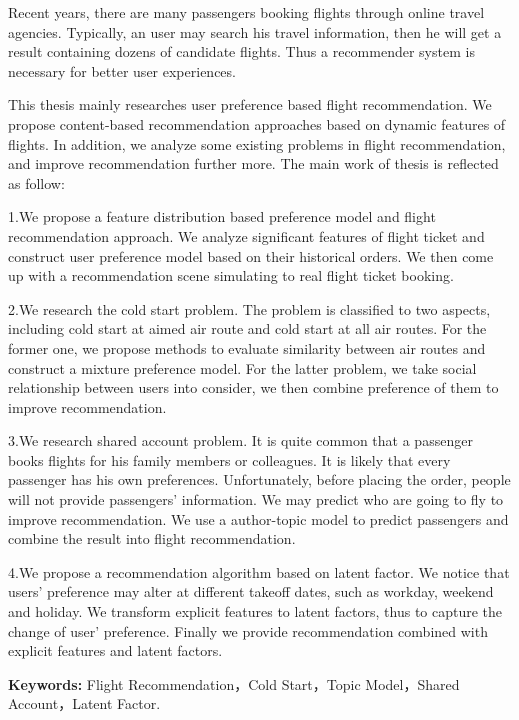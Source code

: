 \begin{englishabstract}

Recent years, there are many passengers booking flights through online travel agencies. Typically, an user may search his travel information, then he will get a result containing dozens of candidate flights. Thus a recommender system is necessary for better user experiences.

This thesis mainly researches user preference based flight recommendation. We propose content-based recommendation approaches based on dynamic features of flights. In addition, we analyze some existing problems in flight recommendation, and improve recommendation further more. The main work of thesis is reflected as follow:

1.We propose a feature distribution based preference model and flight recommendation approach. We analyze significant features of flight ticket and construct user preference model based on their historical orders. We then come up with a recommendation scene simulating to real flight ticket booking.

2.We research the cold start problem. The problem is classified to two aspects, including cold start at aimed air route and cold start at all air routes. For the former one, we propose methods to evaluate similarity between air routes and construct a mixture preference model. For the latter problem, we take social relationship between users into consider, we then combine preference of them to improve recommendation.

3.We research shared account problem. It is quite common that a passenger books flights for his family members or colleagues. It is likely that every passenger has his own preferences. Unfortunately, before placing the order, people will not provide passengers' information. We may predict who are going to fly to improve recommendation. We use a author-topic model to predict passengers and combine the result into flight recommendation.

4.We propose a recommendation algorithm based on latent factor. We notice that users' preference may alter at different takeoff dates, such as workday, weekend and holiday. We transform explicit features to latent factors, thus to capture the change of user' preference. Finally we provide recommendation combined with explicit features and latent factors.


\textbf{Keywords:} Flight Recommendation，Cold Start，Topic Model，Shared Account，Latent Factor.
\end{englishabstract}

